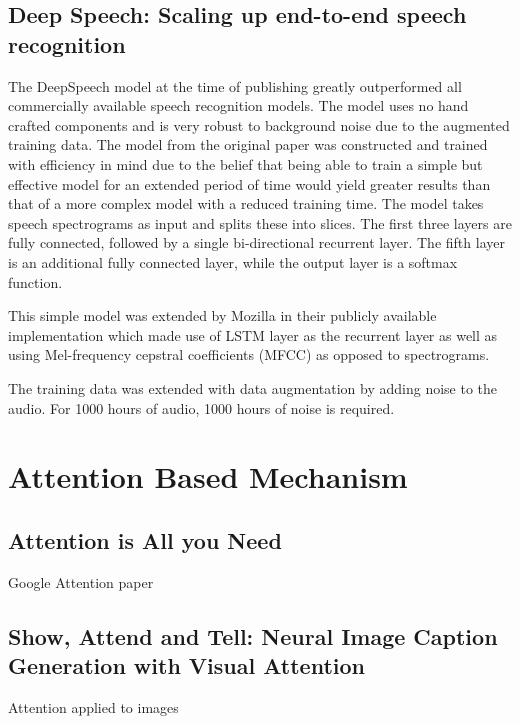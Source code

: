\documentclass[12pt]{article}
\begin{document}
\subsection{Deep Speech: Scaling up end-to-end speech recognition}
The DeepSpeech model \cite{Hannun2014} at the time of publishing greatly outperformed all commercially available speech recognition models.
The model uses no hand crafted components and is very robust to background noise due to the augmented training data.
The model from the original paper was constructed and trained with efficiency in mind due to the belief that being able to train a simple but effective model for an extended period of time would yield greater results than that of a more complex model with a reduced training time.
The model takes speech spectrograms as input and splits these into slices.
The first three layers are fully connected, followed by a single bi-directional recurrent layer.
The fifth layer is an additional fully connected layer, while the output layer is a softmax function.

This simple model was extended by Mozilla in their publicly available implementation which made use of LSTM layer as the recurrent layer as well as using Mel-frequency cepstral coefficients (MFCC) as opposed to spectrograms.

The training data was extended with data augmentation by adding noise to the audio.
For 1000 hours of audio, 1000 hours of noise is required.


\section{Attention Based Mechanism}
\subsection{Attention is All you Need}
Google Attention paper \cite{Vaswani2017}

\subsection{Show, Attend and Tell: Neural Image Caption Generation with Visual
Attention}
Attention applied to images \cite{Xu2015}




\end{document}
